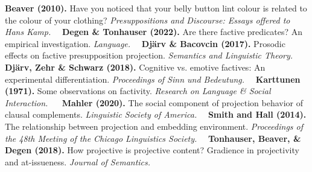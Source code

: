 \documentclass[12pt, letterpaper]{article}
\begin{document}




\newpage
{\scriptsize
{}
%
{\bf Beaver (2010).} Have you noticed that your belly button lint colour is related to the colour of your clothing? {\em Presuppositions and Discourse: Essays offered to Hans Kamp.}~\textbullet~
{\bf Degen \& Tonhauser (2022).} Are there factive predicates? An empirical investigation. {\em Language.}~\textbullet~
{\bf Djärv \& Bacovcin (2017).} Prosodic effects on factive presupposition projection. {\em Semantics and Linguistic Theory.}~\textbullet~
{\bf Djärv, Zehr \& Schwarz (2018).} Cognitive vs. emotive factives: An experimental differentiation. {\em Proceedings of Sinn und Bedeutung.}~\textbullet~
{\bf Karttunen (1971).} Some observations on factivity. {\em Research on Language \& Social Interaction.} ~\textbullet~
{\bf Mahler (2020).} The social component of projection behavior of clausal complements. {\em Linguistic Society of America.}~\textbullet~
{\bf Smith and Hall (2014).} The relationship between projection and embedding environment. {\em Proceedings of the 48th Meeting of the Chicago Linguistics Society.}~\textbullet~
{\bf Tonhauser, Beaver, \& Degen (2018).} How projective is projective content? Gradience in projectivity and at-issueness. {\em Journal of Semantics.}~\textbullet~

}
\end{document}
